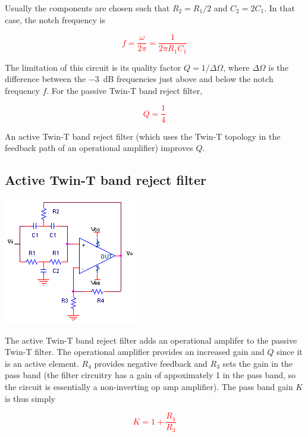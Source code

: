 Usually the components are chosen such that $R_2 = R_1/2$ and $C_2 = 2C_1$.
In that case, the notch frequency is

\textcolor{red}{
\begin{equation}
f = \frac{\omega}{2\pi} = \frac{1}{2\pi R_1C_1}
\label{eq:passiveTwinTnotchfreq}
\end{equation}
}

The limitation of this circuit is its quality factor $Q = 1/\Delta\Omega$, where $\Delta\Omega$ is the difference between the \SI{-3}{\dB} frequencies just above and below the notch frequency $f$.
For the passive Twin-T band reject filter,

\textcolor{red}{
\begin{equation}
Q = \frac{1}{4}
\label{passiveTwinT_Q}
\end{equation}
}

An active Twin-T band reject filter (which uses the Twin-T topology in the feedback path of an operational amplifier) improves $Q$. \autocite[321]{op-amps-for-everyone}

\subsection{Active Twin-T band reject filter}
\begin{center}
	\includegraphics{schematics/activeTwinTbandrejectfilter.PNG}
\end{center}
The active Twin-T band reject filter adds an operational amplifer to the passive Twin-T filter.
The operational amplifier provides an increased gain and $Q$ since it is an active element.
$R_4$ provides negative feedback and $R_3$ sets the gain in the pass band (the filter circuitry has a gain of appoximately 1 in the pass band, so the circuit is essentially a non-inverting op amp amplifier).
The pass band gain $K$ is thus simply

\textcolor{red}{
\begin{equation}
K = 1 + \frac{R_4}{R_3}
\end{equation}
}

